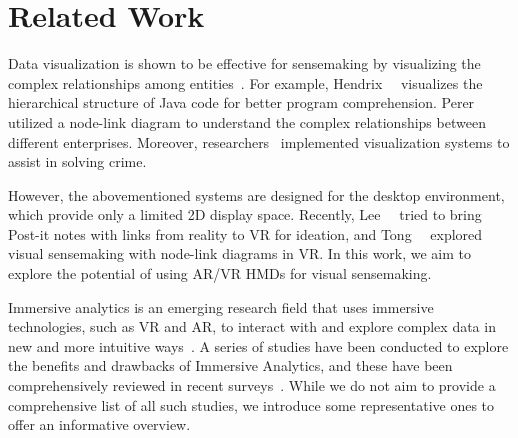 \section{Related Work}

Data visualization is shown to be effective for sensemaking by visualizing the complex relationships among entities~\cite{card1999readings}. For example, Hendrix~\etal{}~\cite{hendrix2000visualizations} visualizes the hierarchical structure of Java code for better program comprehension. Perer~\etal{}~\cite{perer2011visual} utilized a node-link diagram to understand the complex relationships between different enterprises. Moreover, researchers~\cite{balakrishnan2008visualizations, lin2021taxthemis, mahyar2014supporting} implemented visualization systems to assist in solving crime.

However, the abovementioned systems are designed for the desktop environment, which provide only a limited 2D display space. Recently, Lee~\etal{}~\cite{lee2021post} tried to bring Post-it notes with links from reality to VR for ideation, and Tong~\etal{}~\cite{tong2023towards} explored visual sensemaking with node-link diagrams in VR.
In this work, we aim to explore the potential of using AR/VR HMDs for visual sensemaking.

 Immersive analytics
is an emerging research field that uses
immersive technologies, such as VR and AR, to interact with and explore complex data in new and more intuitive ways~\cite{marriott2018immersive,ens2021grand}.
A series of studies have been conducted to explore the benefits and drawbacks of Immersive Analytics, and these have been comprehensively reviewed in recent surveys~\cite{fonnet2021survey,kraus2022immersive,skarbez2019immersive,klein2022immersive}.
While we do not aim to provide a comprehensive list of all such studies, we introduce some representative ones to offer an informative overview.

